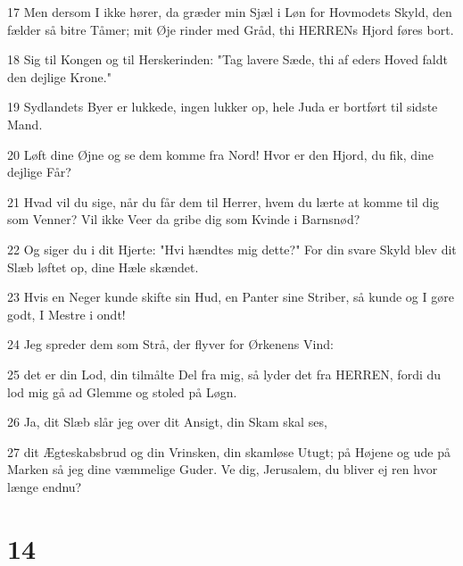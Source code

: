 \par 17 Men dersom I ikke hører, da græder min Sjæl i Løn for Hovmodets Skyld, den fælder så bitre Tåmer; mit Øje rinder med Gråd, thi HERRENs Hjord føres bort.
\par 18 Sig til Kongen og til Herskerinden: "Tag lavere Sæde, thi af eders Hoved faldt den dejlige Krone."
\par 19 Sydlandets Byer er lukkede, ingen lukker op, hele Juda er bortført til sidste Mand.
\par 20 Løft dine Øjne og se dem komme fra Nord! Hvor er den Hjord, du fik, dine dejlige Får?
\par 21 Hvad vil du sige, når du får dem til Herrer, hvem du lærte at komme til dig som Venner? Vil ikke Veer da gribe dig som Kvinde i Barnsnød?
\par 22 Og siger du i dit Hjerte: "Hvi hændtes mig dette?" For din svare Skyld blev dit Slæb løftet op, dine Hæle skændet.
\par 23 Hvis en Neger kunde skifte sin Hud, en Panter sine Striber, så kunde og I gøre godt, I Mestre i ondt!
\par 24 Jeg spreder dem som Strå, der flyver for Ørkenens Vind:
\par 25 det er din Lod, din tilmålte Del fra mig, så lyder det fra HERREN, fordi du lod mig gå ad Glemme og stoled på Løgn.
\par 26 Ja, dit Slæb slår jeg over dit Ansigt, din Skam skal ses,
\par 27 dit Ægteskabsbrud og din Vrinsken, din skamløse Utugt; på Højene og ude på Marken så jeg dine væmmelige Guder. Ve dig, Jerusalem, du bliver ej ren hvor længe endnu?

\chapter{14}

